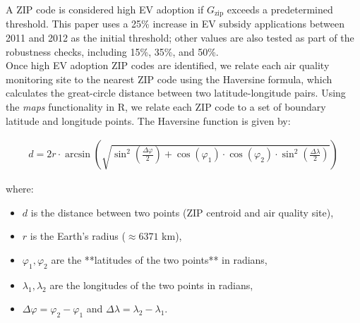 \documentclass[12pt]{article}
\newcommand\tab[1][.50cm]{\hspace*{#1}}
\begin{document}
\begin{multicols}{2}
		A ZIP code is considered high EV adoption if \( G_{\text{zip}} \) exceeds a predetermined threshold. This paper uses a 25\% increase in EV subsidy applications between 2011 and 2012 as the initial threshold; other values are also tested as part of the robustness checks, including 15\%, 35\%, and 50\%. \\
		\tab Once high EV adoption ZIP codes are identified, we relate each air quality monitoring site to the nearest ZIP code using the Haversine formula, which calculates the great-circle distance between two latitude-longitude pairs. Using the \emph{maps} functionality in R, we relate each ZIP code to a set of boundary latitude and longitude points. The Haversine function is given by:
	\end{multicols}
	\begin{align}
		d = 2r \cdot \arcsin \left( \sqrt{\sin^2\left(\frac{\Delta \varphi}{2}\right) + \cos(\varphi_1) \cdot \cos(\varphi_2) \cdot \sin^2\left(\frac{\Delta \lambda}{2}\right)} \right)
	\end{align}
	
	where:
	\begin{itemize}
		\item \( d \) is the distance between two points (ZIP centroid and air quality site),
		\item \( r \) is the Earth’s radius (\(\approx 6371\) km),
		\item \( \varphi_1, \varphi_2 \) are the **latitudes of the two points** in radians,
		\item \( \lambda_1, \lambda_2 \) are the longitudes of the two points in radians,
		\item \( \Delta \varphi = \varphi_2 - \varphi_1 \) and \( \Delta \lambda = \lambda_2 - \lambda_1 \).
	\end{itemize}
	\newpage
	
\end{document}

